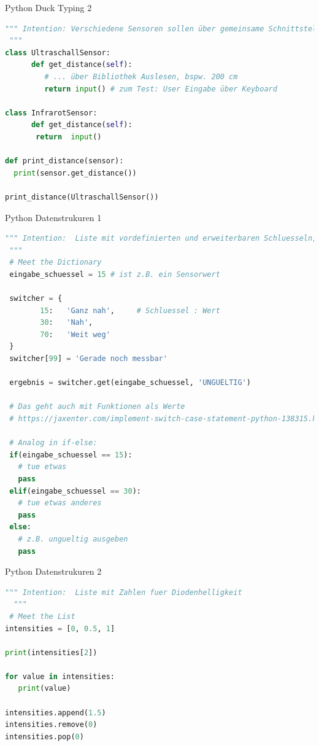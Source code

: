 \begin{frame}[fragile]{Python Duck Typing 2}
\begin{lstlisting}[language=Python]
 """ Intention: Verschiedene Sensoren sollen über gemeinsame Schnittstelle die Distanz zurückliefern
 """
class UltraschallSensor:
	  def get_distance(self):
	     # ... über Bibliothek Auslesen, bspw. 200 cm
	     return input() # zum Test: User Eingabe über Keyboard

class InfrarotSensor:
	  def get_distance(self):
	   return  input()

def print_distance(sensor):
  print(sensor.get_distance())

print_distance(UltraschallSensor())

\end{lstlisting}
\end{frame}


\begin{frame}[fragile]{Python Datenstrukuren 1}
\begin{lstlisting}[language=Python]
 """ Intention:  Liste mit vordefinierten und erweiterbaren Schluesseln, Format aehnlich zu Java Script Object Literals
 """
 # Meet the Dictionary
 eingabe_schuessel = 15 # ist z.B. ein Sensorwert

 switcher = {
        15:   'Ganz nah',     # Schluessel : Wert
        30:   'Nah',
        70:   'Weit weg'
 }
 switcher[99] = 'Gerade noch messbar'

 ergebnis = switcher.get(eingabe_schuessel, 'UNGUELTIG')

 # Das geht auch mit Funktionen als Werte
 # https://jaxenter.com/implement-switch-case-statement-python-138315.html

 # Analog in if-else:
 if(eingabe_schuessel == 15):
   # tue etwas
   pass
 elif(eingabe_schuessel == 30):
   # tue etwas anderes
   pass
 else:
   # z.B. ungueltig ausgeben
   pass
\end{lstlisting}
\end{frame}

\begin{frame}[fragile]{Python Datenstrukuren 2}
\begin{lstlisting}[language=Python]
 """ Intention:  Liste mit Zahlen fuer Diodenhelligkeit
  """
 # Meet the List
intensities = [0, 0.5, 1]

print(intensities[2])

for value in intensities:
   print(value)

intensities.append(1.5)
intensities.remove(0)
intensities.pop(0)


\end{lstlisting}
\end{frame}


